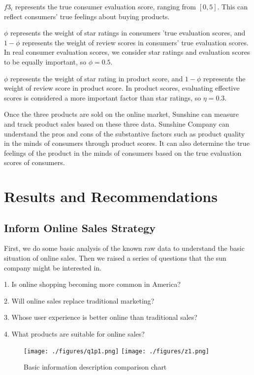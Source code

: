 \documentclass{mcmthesis}
\begin{document}
$f3_i$ represents the true consumer evaluation score, ranging from $[0,5]$. This can reflect consumers' true feelings about buying products.

$\phi$ represents the weight of star ratings in consumers 'true evaluation scores, and $1- \phi$ represents the weight of review scores in consumers' true evaluation scores. In real consumer evaluation scores, we consider star ratings and evaluation scores to be equally important, so $\phi = 0.5$.

$\phi$ represents the weight of star rating in product score, and $1- \phi$ represents the weight of review score in product score. In product scores, evaluating effective scores is considered a more important factor than star ratings, so $\eta = 0.3$.

Once the three products are sold on the online market, Sunshine can measure and track product sales based on these three data. Sunshine Company can understand the pros and cons of the substantive factors such as product quality in the minds of consumers through product scores. It can also determine the true feelings of the product in the minds of consumers based on the true evaluation scores of consumers.

\section{ Results and Recommendations}
\subsection{Inform Online Sales Strategy}
First, we do some basic analysis of the known raw data to understand the basic situation of online sales. Then we raised a series of questions that the sun company might be interested in.

1. Is online shopping becoming more common in America?

2. Will online sales replace traditional marketing?

3. Whose user experience is better online than traditional sales?

4. What products are suitable for online sales?

\begin{figure}[h]
	\center
	\texttt{[image: ./figures/q1p1.png]}
	\texttt{[image: ./figures/z1.png]}
	\caption{Basic information description comparison chart} \label{z1_q1p1}
\end{figure}
\end{document}
